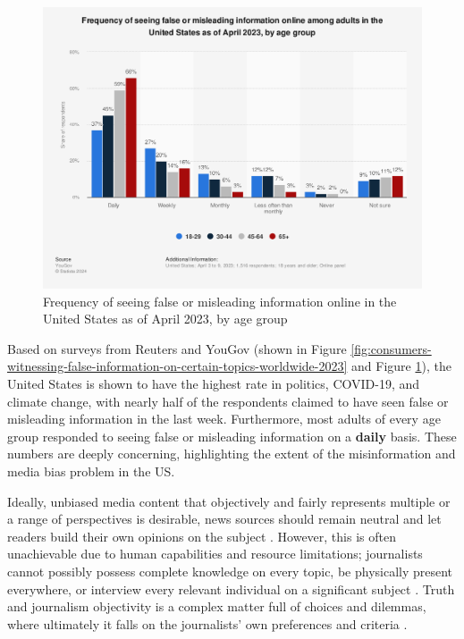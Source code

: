 \begin{figure}[htbp]
    \centering
    \includegraphics[width=0.9\linewidth]{images/statistic_id1462057_frequency-of-seeing-false-information-online-in-the-us-2023-by-age-group.png}
    \caption{Frequency of seeing false or misleading information online in the United States as of April 2023, by age group \cite{yougov-2023-frequency}}
    \label{fig:frequency-of-seeing-false-information-online-in-the-us-2023-by-age-group}
\end{figure}

Based on surveys from Reuters and YouGov (shown in Figure \ref{fig:consumers-witnessing-false-information-on-certain-topics-worldwide-2023} and Figure \ref{fig:frequency-of-seeing-false-information-online-in-the-us-2023-by-age-group}), the United States is shown to have the highest rate in politics, COVID-19, and climate change, with nearly half of the respondents claimed to have seen false or misleading information in the last week. Furthermore, most adults of every age group responded to seeing false or misleading information on a \textbf{daily} basis. These numbers are deeply concerning, highlighting the extent of the misinformation and media bias problem in the US.

Ideally, unbiased media content that objectively and fairly represents multiple or a range of perspectives is desirable, news sources should remain neutral and let readers build their own opinions on the subject \cite{reuters-2021-digital-news-report}. However, this is often unachievable due to human capabilities and resource limitations; journalists cannot possibly possess complete knowledge on every topic, be physically present everywhere, or interview every relevant individual on a significant subject \cite{allsides-2022-bias-definition}. Truth and journalism objectivity is a complex matter full of choices and dilemmas, where ultimately it falls on the journalists' own preferences and criteria \cite{boudana-2011-journalistic-objectivity}.

